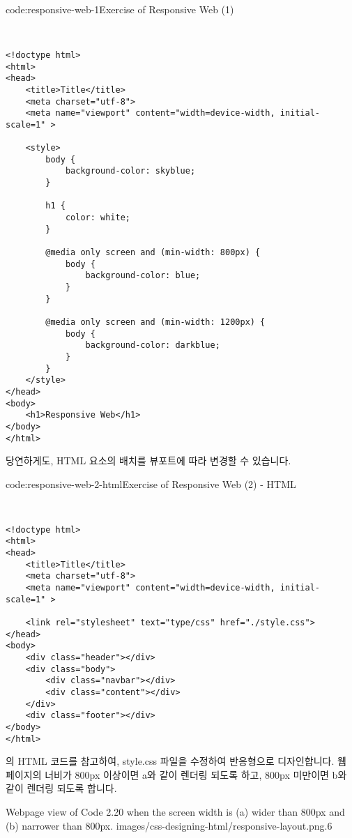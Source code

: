 \begin{codeenv}{code:responsive-web-1}{Exercise of Responsive Web (1)}\begin{verbatim}


<!doctype html>
<html>
<head>
    <title>Title</title>
    <meta charset="utf-8">
    <meta name="viewport" content="width=device-width, initial-scale=1" >

    <style>
        body {
            background-color: skyblue;
        }

        h1 {
            color: white;
        }

        @media only screen and (min-width: 800px) {
            body {
                background-color: blue;
            }           
        }

        @media only screen and (min-width: 1200px) {
            body {
                background-color: darkblue;
            }           
        }
    </style>
</head>
<body>
    <h1>Responsive Web</h1>
</body>
</html>
\end{verbatim}
\end{codeenv}

당연하게도, HTML 요소의 배치를 뷰포트에 따라 변경할 수 있습니다. 

\begin{codeenv}{code:responsive-web-2-html}{Exercise of Responsive Web (2) - HTML}\begin{verbatim}


<!doctype html>
<html>
<head>
    <title>Title</title>
    <meta charset="utf-8">
    <meta name="viewport" content="width=device-width, initial-scale=1" >

    <link rel="stylesheet" text="type/css" href="./style.css">
</head>
<body>
    <div class="header"></div>
    <div class="body">
        <div class="navbar"></div>
        <div class="content"></div>
    </div>
    <div class="footer"></div>
</body>
</html>
\end{verbatim}
\end{codeenv}

의 HTML 코드를 참고하여, style.css 파일을 수정하여 반응형으로 디자인합니다. 웹 페이지의 너비가 800px 이상이면 a와 같이 렌더링 되도록 하고, 800px 미만이면 b와 같이 렌더링 되도록 합니다. 

    {Webpage view of Code 2.20 when the screen width is (a) wider than 800px and (b) narrower than 800px.}
    {images/css-designing-html/responsive-layout.png}{.6}

